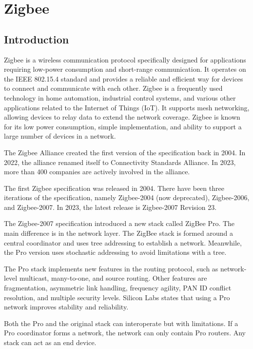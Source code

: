 \section{Zigbee}
\label{sec:zig}

\subsection{Introduction}
\label{zb:into}
Zigbee is a wireless communication protocol specifically designed for
applications requiring low-power consumption and short-range communication.
It operates on the IEEE 802.15.4 standard and provides a reliable and efficient way
for devices to connect and communicate with each other.
Zigbee is a frequently used technology in home automation, industrial control systems,
and various other applications related to the Internet of Things (IoT).
It supports mesh networking, allowing devices to relay data to extend the network
coverage. Zigbee is known for its low power consumption, simple implementation, and
ability to support a large number of devices in a network.

The Zigbee Alliance created the first version of the specification back in 2004.
In 2022, the alliance renamed itself to Connectivity Standards Alliance.
In 2023, more than 400 companies are actively involved in the alliance. \cite{csa:members}

The first Zigbee specification was released in 2004.
There have been three iterations of the specification, namely Zigbee-2004 (now deprecated), Zigbee-2006, and Zigbee-2007.
In 2023, the latest release is Zigbee-2007 Revision 23.

The Zigbee-2007 specification introduced a new stack called ZigBee Pro. The main difference is in the network layer.
The ZigBee stack is formed around a central coordinator and uses tree addressing to establish a network. Meanwhile,
the Pro version uses stochastic addressing to avoid limitations with a tree. \cite{zigbee:silabs:ug103:2}

The Pro stack implements new features in the routing protocol, such as network-level multicast, many-to-one, and source routing.
Other features are fragmentation, asymmetric link handling, frequency agility, PAN ID conflict resolution, and multiple security levels.
Silicon Labs states that using a Pro network improves stability and reliability.

Both the Pro and the original stack can interoperate but with limitations.
If a Pro coordinator forms a network, the network can only contain Pro routers.
Any stack can act as an end device. \cite{zigbee:silabs:ug103:2}

